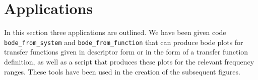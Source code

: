 \documentclass{article}
\begin{document}
	\section{Applications}
	In this section three applications are outlined. We have been given code \texttt{bode\_from\_system} and \texttt{bode\_from\_function} that can produce bode plots for transfer functions given in descriptor form or in the form of a transfer function definition, as well as a script that produces these plots for the relevant frequency ranges.
	These tools have been used in the creation of the subsequent figures.
	
	\vspace{\baselineskip}
	
	
	
\end{document}
